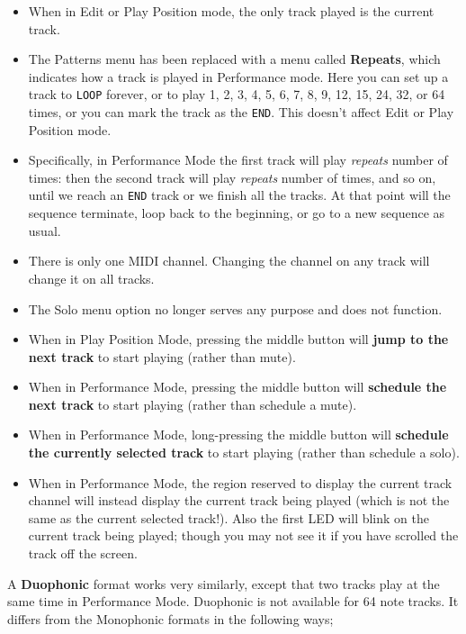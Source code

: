 \documentclass{article}
\begin{document}
\begin{itemize} 
\item When in Edit or Play Position mode, the only track played is the current track.
\item The Patterns menu has been replaced with a menu called {\bf Repeats}, which indicates how a track is played in Performance mode.  Here you can set up a track to {\tt LOOP} forever, or to play 1, 2, 3, 4, 5, 6, 7, 8, 9, 12, 15, 24, 32, or 64 times, or you can mark the track as the {\tt END}.  This doesn't affect Edit or Play Position mode.
\item Specifically, in Performance Mode the first track will play {\it repeats} number of times: then the second track will play {\it repeats} number of times, and so on, until we reach an {\tt END} track or we finish all the tracks. At that point will the sequence terminate, loop back to the beginning, or go to a new sequence as usual.
\item There is only one MIDI channel.  Changing the channel on any track will change it on all tracks.
\item The Solo menu option no longer serves any purpose and does not function.
\item When in Play Position Mode, pressing the middle button will {\bf jump to the next track} to start playing (rather than mute).
\item When in Performance Mode, pressing the middle button will {\bf schedule the next track} to start playing (rather than schedule a mute).
\item When in Performance Mode, long-pressing the middle button will {\bf schedule the currently selected track} to start playing (rather than schedule a solo).
\item When in Performance Mode, the region reserved to display the current track channel will instead display the current track being played (which is not the same as the current selected track!).  Also the first LED will blink on the current track being played; though you may not see it if you have scrolled the track off the screen.
\end{itemize}

A {\bf Duophonic} format works very similarly, except that two tracks play at the same time in Performance Mode.  Duophonic is not available for 64 note tracks.  It differs from the Monophonic formats in the following ways;
\end{document}
